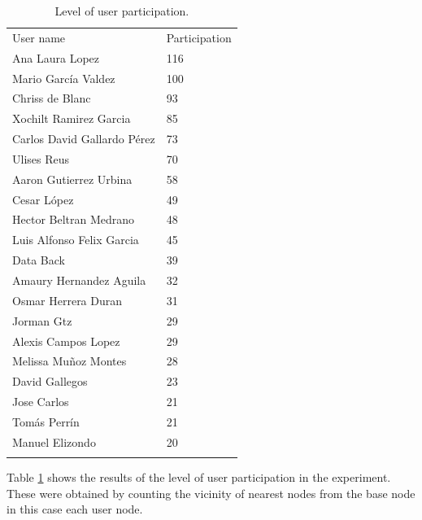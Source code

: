 \begin{table}
\small
\caption{Level of user participation.}
\label{tab:userParticipation_1} 
\centering
\small
\begin{tabular}{p{4cm} p{4cm}}
\hline\noalign{\smallskip}
 User name & Participation   \\
\noalign{\smallskip}\hline\noalign{\smallskip}
\small{Ana Laura Lopez} & \small{116} \\ \hline 
\small{Mario García Valdez} & \small{100} \\ \hline 
\small{Chriss de Blanc} & \small{93} \\ \hline 
\small{Xochilt Ramirez Garcia} & \small{85} \\ \hline 
\small{Carlos David Gallardo Pérez} & \small{73} \\ \hline 
\small{Ulises Reus} & \small{70} \\ \hline 
\small{Aaron Gutierrez Urbina} & \small{58} \\ \hline 
\small{Cesar López} & \small{49} \\ \hline 
\small{Hector Beltran Medrano} & \small{48} \\ \hline 
\small{Luis Alfonso Felix Garcia} & \small{45} \\ \hline 
\small{Data Back} & \small{39} \\ \hline 
\small{Amaury Hernandez Aguila} & \small{32} \\ \hline 
\small{Osmar Herrera Duran} & \small{31} \\ \hline
\small{Jorman Gtz} & \small{29} \\ \hline
\small{Alexis Campos Lopez} & \small{29} \\ \hline
\small{Melissa Muñoz Montes} & \small{28} \\ \hline
\small{David Gallegos} & \small{23} \\ \hline
\small{Jose Carlos} & \small{21} \\ \hline
\small{Tomás Perrín} & \small{21} \\ \hline
\small{Manuel Elizondo} & \small{20} \\ \hline

    
\noalign{\smallskip}\hline
\end{tabular}
\end{table}




Table \ref{tab:userParticipation_1} shows the results of the level of user
participation in the experiment. These were obtained by counting the vicinity of
nearest nodes from the base node in this case each user node.



